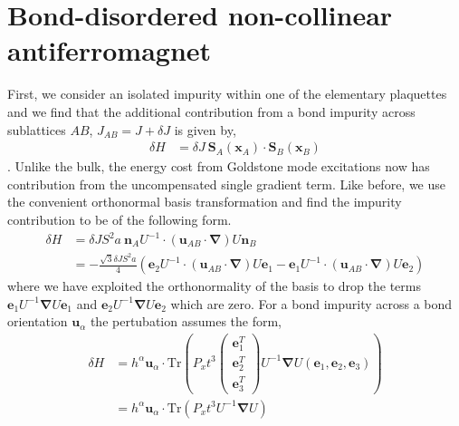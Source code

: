 \documentclass[notitlepage,onecolumn,showpacs,11pt]{revtex4-1}
\newcommand{\mbf}[1]{\mathbf{#1}}
\newcommand{\grad}{\boldsymbol{\nabla}}
\newcommand{\Tr}{\text{Tr}}
\begin{document}
\section{Bond-disordered non-collinear antiferromagnet}

First, we consider an isolated impurity within one of the elementary plaquettes
and we find that the additional contribution from a bond impurity across 
sublattices $AB$, $J_{AB} = J + \delta J$ is given by,
\begin{equation}
    \begin{aligned}
        \delta H &= \delta J \ \mbf{S}_A(\mbf{x}_A)\cdot\mbf{S}_B(\mbf{x}_B)
    \end{aligned}
\end{equation}
. Unlike the bulk, the energy cost from Goldstone mode excitations now has
contribution from the uncompensated single gradient term. Like before, we 
use the convenient orthonormal basis transformation and find the impurity 
contribution to be of the following form.
\begin{equation}
    \begin{aligned}
        \delta H &= \delta JS^2a \ \mbf{n}_AU^{-1}\cdot(\mbf{u}_{AB}\cdot\grad)U\mbf{n}_B\\
        &= -\frac{\sqrt{3}\delta JS^2a}{4}\left(
        \mbf{e}_2 U^{-1}\cdot(\mbf{u}_{AB}\cdot\grad)U \mbf{e}_1
        -\mbf{e}_1 U^{-1}\cdot(\mbf{u}_{AB}\cdot\grad)U\mbf{e}_2
        \right)
    \end{aligned}
\end{equation}
where we have exploited the orthonormality of the basis to drop the terms 
$\mbf{e}_1U^{-1}\grad U\mbf{e}_1$ and $\mbf{e}_2 U^{-1}\grad U\mbf{e}_2$ which 
are zero. For a bond impurity across a bond orientation $\mbf{u}_\alpha$ 
the pertubation assumes the form,
\begin{equation}
    \begin{aligned}
        \delta H &= h^\alpha\mbf{u}_\alpha\cdot\Tr\left(
        P_xt^{3}
        \begin{pmatrix}
            \mbf{e}_1^T\\
            \mbf{e}_2^T\\
            \mbf{e}_3^T
        \end{pmatrix}
        U^{-1}
        \grad
        U
        (\mbf{e}_1,\mbf{e}_2,\mbf{e}_3)\right) \\
        &= h^\alpha\mbf{u}_\alpha
        \cdot\Tr\left(P_xt^3 U^{-1}\grad U\right)
    \end{aligned}
\end{equation}
\end{document}
